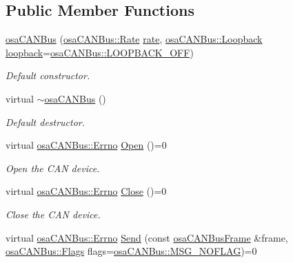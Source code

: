 \subsection*{Public Member Functions}
\begin{DoxyCompactItemize}
\item 
\hyperlink{classosa_c_a_n_bus_abe19d4eebf9d21dcc3f23eb245716a89}{osa\-C\-A\-N\-Bus} (\hyperlink{classosa_c_a_n_bus_ae977dbc0e1c16772395408c8e018fe6c}{osa\-C\-A\-N\-Bus\-::\-Rate} \hyperlink{classosa_c_a_n_bus_a4ff86a9ecf19161b1f34666888e0a331}{rate}, \hyperlink{classosa_c_a_n_bus_a992406c83a336e95fb4a09b0b13df786}{osa\-C\-A\-N\-Bus\-::\-Loopback} \hyperlink{classosa_c_a_n_bus_a724e9c478dd48908882e29f189d98968}{loopback}=\hyperlink{classosa_c_a_n_bus_a992406c83a336e95fb4a09b0b13df786ae2557509d0c1ac68029eeb6bdf6e703d}{osa\-C\-A\-N\-Bus\-::\-L\-O\-O\-P\-B\-A\-C\-K\-\_\-\-O\-F\-F})
\begin{DoxyCompactList}\small\item\em Default constructor. \end{DoxyCompactList}\item 
virtual \hyperlink{classosa_c_a_n_bus_a055aece68a45f1e8c8375c62eaaf8e0c}{$\sim$osa\-C\-A\-N\-Bus} ()
\begin{DoxyCompactList}\small\item\em Default destructor. \end{DoxyCompactList}\item 
virtual \hyperlink{classosa_c_a_n_bus_a6fa3e95ec4c36932d0640e40e0748fde}{osa\-C\-A\-N\-Bus\-::\-Errno} \hyperlink{classosa_c_a_n_bus_a3471574c0625ff4ec43b2fa8a3a020af}{Open} ()=0
\begin{DoxyCompactList}\small\item\em Open the C\-A\-N device. \end{DoxyCompactList}\item 
virtual \hyperlink{classosa_c_a_n_bus_a6fa3e95ec4c36932d0640e40e0748fde}{osa\-C\-A\-N\-Bus\-::\-Errno} \hyperlink{classosa_c_a_n_bus_aeabd3fe0c7db2c13978834f4bd2f08db}{Close} ()=0
\begin{DoxyCompactList}\small\item\em Close the C\-A\-N device. \end{DoxyCompactList}\item 
virtual \hyperlink{classosa_c_a_n_bus_a6fa3e95ec4c36932d0640e40e0748fde}{osa\-C\-A\-N\-Bus\-::\-Errno} \hyperlink{classosa_c_a_n_bus_a21b88fd2a857089845305d1e2eabb5b9}{Send} (const \hyperlink{classosa_c_a_n_bus_frame}{osa\-C\-A\-N\-Bus\-Frame} \&frame, \hyperlink{classosa_c_a_n_bus_a74fe35c6059237887431f3ccece7b21b}{osa\-C\-A\-N\-Bus\-::\-Flags} flags=\hyperlink{classosa_c_a_n_bus_a74fe35c6059237887431f3ccece7b21ba30f701fa6e0dba6e274540941ccd3978}{osa\-C\-A\-N\-Bus\-::\-M\-S\-G\-\_\-\-N\-O\-F\-L\-A\-G})=0

\end{DoxyCompactItemize}
